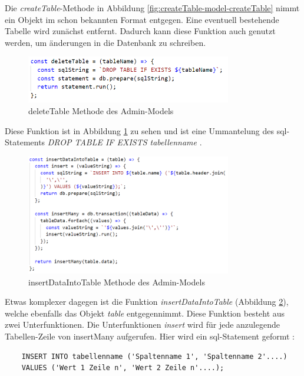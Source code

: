 Die \textit{createTable}-Methode in Abbildung \ref{fig:createTable-model-createTable} nimmt ein Objekt im schon bekannten Format entgegen. Eine eventuell bestehende Tabelle wird zunächst entfernt. Dadurch kann diese Funktion auch genutzt werden, um änderungen in die Datenbank zu schreiben. 

\begin{figure}[h]
    \centering
    \includegraphics[width=0.8\textwidth]{figures/code-model-deleteTable.png}
    \caption{deleteTable Methode des Admin-Models}
    \label{fig:createTable-model-deleteTable}
\end{figure}

Diese Funktion ist in Abbildung \ref{fig:createTable-model-deleteTable} zu sehen und ist eine Ummantelung des \gls{sql}-Statements \textit{DROP TABLE IF EXISTS tabellenname} \cite{Gerner.2006}.


\begin{figure}[h]
    \centering
    \includegraphics[width=0.8\textwidth]{figures/code-model-insertDataIntoTable.png}
    \caption{insertDataIntoTable Methode des Admin-Models}
    \label{fig:createTable-model-insertDataIntoTable}
\end{figure}

Etwas komplexer dagegen ist die Funktion \textit{insertDataIntoTable} (Abbildung \ref{fig:createTable-model-insertDataIntoTable}), welche ebenfalls das Objekt \textit{table} entgegennimmt. Diese Funktion besteht aus zwei Unterfunktionen.
Die Unterfunktionen \textit{insert} wird für jede anzulegende Tabellen-Zeile von insertMany aufgerufen. Hier wird ein \gls{sql}-Statement geformt \cite{Gerner.2006}:
\begin{verbatim}
    INSERT INTO tabellenname ('Spaltenname 1', 'Spaltenname 2'....) 
    VALUES ('Wert 1 Zeile n', 'Wert 2 Zeile n'....);
\end{verbatim}

